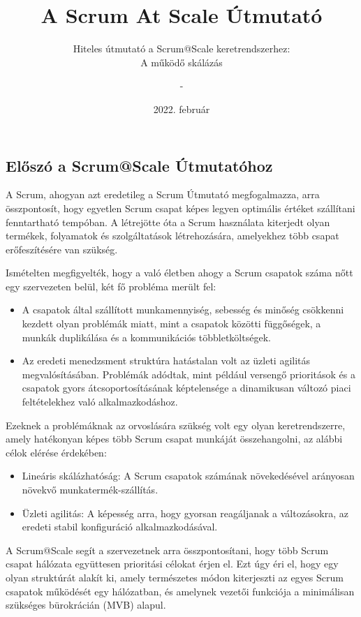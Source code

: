 \documentclass[12pt,a4paper,parskip=full]{scrartcl}
\title{\Huge{\color{red}\textbf{A Scrum At Scale
\textsuperscript{\registered} 
Útmutató}}}
\subtitle{\color{gray}Hiteles útmutató a Scrum@Scale keretrendszerhez:\\ A működő skálázás}
\author{-}
\date{2022. február}
\makeatletter
\renewcommand{\maketitle}{\begin{titlepage}
    \begin{center}
      \makebox[\textwidth]{\fontsize{40}{40}\selectfont{\color{red}\@title\textsuperscript{\textbf{\textregistered}}}}\\
      \vspace{0.5cm}      	
      \fontsize{20}{20}\selectfont{\color{gray}\@subtitle}
    \end{center}
    \vspace*{1cm}
    \begin{figure}[H]
      \centering
      \texttt{[image: Cover.png]}
    \end{figure}
    \begin{center}    
      \small {
        Verzió \version -- \@date \\
        \vspace{0.3 cm}
        Fordítás verziója \translationver
      }
    \end{center}
    \vspace{2.5 cm}
    \begin{center}
      \footnotesize{
        ©2006-2022 Jeff Sutherland and Scrum Inc., All Rights Reserved\\
        Scrum@Scale is a~registered trademark of Scrum Inc.\\
        Released under Creative Commons 4.0 Attribution-Sharealike License
      }
    \end{center}
  \end{titlepage}
}
\newcommand{\version}{2.1}
\newcommand{\translationver}{2025.03.19.}
\makeatother
\begin{document}
\tableofcontents

\subsection{Előszó a Scrum@Scale Útmutatóhoz}\label{preface-to-the-ScrumatScale-guide}

A Scrum, ahogyan azt eredetileg a Scrum Útmutató megfogalmazza, arra összpontosít, hogy egyetlen Scrum csapat képes legyen optimális értéket szállítani fenntartható tempóban. A létrejötte óta a Scrum használata kiterjedt olyan termékek, folyamatok és szolgáltatások létrehozására, amelyekhez több csapat erőfeszítésére van szükség.

Ismételten megfigyelték, hogy a való életben ahogy a Scrum csapatok száma nőtt egy szervezeten belül, két fő probléma merült fel:

\begin{itemize}%
\itemsep10pt
\item
 A csapatok által szállított munkamennyiség, sebesség és minőség csökkenni kezdett olyan problémák miatt, mint a csapatok közötti függőségek, a munkák duplikálása és a kommunikációs többletköltségek.
\item
 Az eredeti menedzsment struktúra hatástalan volt az üzleti agilitás megvalósításában. Problémák adódtak, mint például versengő prioritások és a csapatok gyors átcsoportosításának képtelensége a dinamikusan változó piaci feltételekhez való alkalmazkodáshoz.
\end{itemize}

Ezeknek a problémáknak az orvoslására szükség volt egy olyan keretrendszerre, amely hatékonyan képes több Scrum csapat munkáját összehangolni, az alábbi célok elérése érdekében:

\begin{itemize}
\itemsep10pt
\item
 Lineáris skálázhatóság: A Scrum csapatok számának növekedésével arányosan növekvő munkatermék-szállítás.
\item
 Üzleti agilitás: A képesség arra, hogy gyorsan reagáljanak a változásokra, az eredeti stabil konfiguráció alkalmazkodásával.
\end{itemize}

A Scrum@Scale segít a szervezetnek arra összpontosítani, hogy több Scrum csapat hálózata együttesen prioritási célokat érjen el. Ezt úgy éri el, hogy egy olyan struktúrát alakít ki, amely természetes módon kiterjeszti az egyes Scrum csapatok működését egy hálózatban, és amelynek vezetői funkciója a minimálisan szükséges bürokrácián (MVB) alapul.
\end{document}
